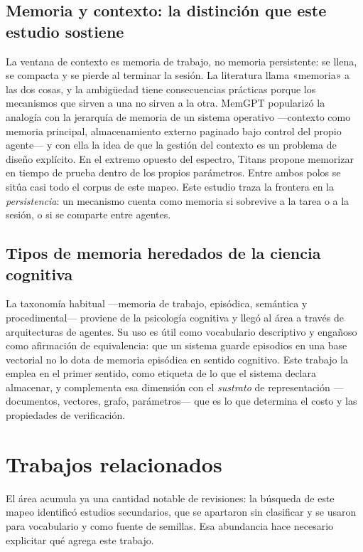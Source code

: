 \documentclass[conference]{IEEEtran}
\begin{document}
\subsection{Memoria y contexto: la distinción que este estudio sostiene}

La ventana de contexto es memoria de trabajo, no memoria persistente: se llena, se compacta y se
pierde al terminar la sesión. La literatura llama «memoria» a las dos cosas, y la ambigüedad tiene
consecuencias prácticas porque los mecanismos que sirven a una no sirven a la otra. MemGPT
\cite{cW4387636003} popularizó la analogía con la jerarquía de memoria de un sistema operativo
—contexto como memoria principal, almacenamiento externo paginado bajo control del propio agente— y
con ella la idea de que la gestión del contexto es un problema de diseño explícito. En el extremo
opuesto del espectro, Titans \cite{cW4406032263} propone memorizar en tiempo de prueba dentro de los
propios parámetros. Entre ambos polos se sitúa casi todo el corpus de este mapeo. Este estudio traza
la frontera en la \emph{persistencia}: un mecanismo cuenta como memoria si sobrevive a la tarea o a
la sesión, o si se comparte entre agentes.

\subsection{Tipos de memoria heredados de la ciencia cognitiva}

La taxonomía habitual —memoria de trabajo, episódica, semántica y procedimental— proviene de la
psicología cognitiva y llegó al área a través de arquitecturas de agentes. Su uso es útil como
vocabulario descriptivo y engañoso como afirmación de equivalencia: que un sistema guarde episodios
en una base vectorial no lo dota de memoria episódica en sentido cognitivo. Este trabajo la emplea
en el primer sentido, como etiqueta de lo que el sistema declara almacenar, y complementa esa
dimensión con el \emph{sustrato} de representación —documentos, vectores, grafo, parámetros— que es
lo que determina el costo y las propiedades de verificación.

\section{Trabajos relacionados}
\label{sec:related}

El área acumula ya una cantidad notable de revisiones: la búsqueda de este mapeo identificó
\clSelSecundarios{} estudios secundarios, que se apartaron sin clasificar y se usaron para vocabulario
y como fuente de semillas. Esa abundancia hace necesario explicitar qué agrega este trabajo.
\end{document}
